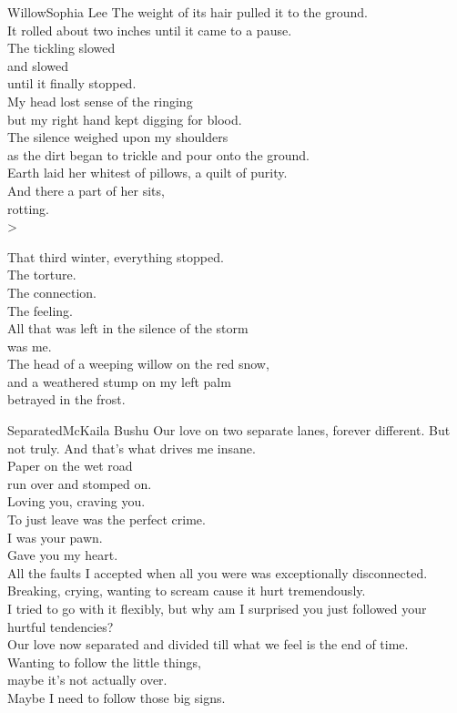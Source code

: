 \begin{poetry}{Willow}{Sophia Lee}
    The weight of its hair pulled it to the ground.\\
    It rolled about two inches until it came to a pause.\\
    The tickling slowed\\
    and slowed\\
    until it finally stopped.\\
    My head lost sense of the ringing\\
    but my right hand kept digging for blood.\\
    The silence weighed upon my shoulders\\
    as the dirt began to trickle and pour onto the ground.\\
    Earth laid her whitest of pillows, a quilt of purity.\\
    And there a part of her sits,\\
    rotting.\\>
    
    That third winter, everything stopped.\\
    The torture.\\
    The connection.\\
    The feeling.\\
    All that was left in the silence of the storm\\
    was me.\\
    The head of a weeping willow on the red snow,\\
    and a weathered stump on my left palm\\
    betrayed in the frost.
\end{poetry}



\begin{poetry}{Separated}{McKaila Bushu}
Our love on two separate lanes, forever different. But not truly. And that's what drives me insane.\\
Paper on the wet road\\
run over and stomped on.\\
Loving you, craving you.\\
To just leave was the perfect crime.\\
I was your pawn.\\
Gave you my heart.\\
All the faults I accepted when all you were was exceptionally disconnected.\\
Breaking, crying, wanting to scream cause it hurt tremendously.\\
I tried to go with it flexibly, but why am I surprised you just followed your hurtful tendencies?\\
Our love now separated and divided till what we feel is the end of time.\\
Wanting to follow the little things,\\
maybe it's not actually over.\\
Maybe I need to follow those big signs.
\end{poetry}

